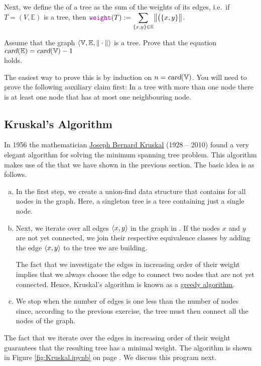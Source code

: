 Next, we define the  of a tree as the sum of the weights of its edges,
i.e.~if $T = (V,\mathbb{E})$ is a tree, then
$\ds \mytt{weight}(T) := \sum\limits_{\{x,y\} \in \mathbb{E}} \Weight{\bigl(\{x,y\}}$.

\exercise
Assume that the graph $\langle {\mathbb V}, {\mathbb E}, \|\cdot\|\rangle$ is a tree.  Prove that the equation
\\[0.2cm]
\hspace*{1.3cm}
$\textsl{card}({\mathbb E}) = \textsl{card}({\mathbb V}) - 1$
\\[0.2cm]
holds.  
\vspace*{0.2cm}

\hint
The easiest way to prove this is by induction on $n = \textsl{card}(\mathbb{V})$.  You will need to prove the
following auxiliary claim first: In a tree with more than one node there is at least one node that has
at most one neighbouring node. 
\eox

\subsection{Kruskal's Algorithm}
In 1956 the mathematician \href{https://en.wikipedia.org/wiki/Joseph_Kruskal}{Joseph Bernard Kruskal} (1928 -- 2010) 
found a very elegant algorithm for solving the minimum spanning tree problem.   This algorithm makes use
of the  that we have shown in the previous section.  The basic idea is as
follows.
\begin{enumerate}[(a)]
\item In the first step, we create a union-find data structure that contains 
      for all nodes in the graph.  Here, a singleton tree is a tree containing just a single node.
\item Next, we iterate over all edges $\pair(x, y)$ in the graph in .
      If the nodes $x$ and $y$ are not yet connected, we join their respective equivalence classes by adding
      the edge $\pair(x, y)$ to the tree we are building.

      The fact that we investigate the edges in increasing order of their weight implies that we always choose
      the  edge to connect two nodes that are not yet connected.  Hence, Kruskal's algorithm is
      known as a \href{https://en.wikipedia.org/wiki/Greedy_algorithm}{greedy algorithm}.
\item We stop when the number of edges is one less than the number of nodes since, according to the
      previous exercise, the tree must then connect all the nodes of the graph. 
\end{enumerate}
The fact that we iterate over the edges in increasing order of their weight guarantees that the
resulting tree has a minimal weight.
The algorithm is shown in Figure \ref{fig:Kruskal.ipynb} on page \pageref{fig:Kruskal.ipynb}.  We
discuss this program next.

